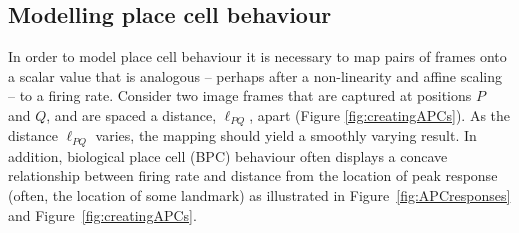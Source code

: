 %
%
%
%



\subsection{Modelling place cell behaviour}
\label{sec:kerneltoAPC}
In order to model place cell behaviour it is necessary to map pairs of frames onto a scalar value that is analogous -- perhaps after a non-linearity and affine scaling -- to a firing rate. Consider two image frames that are captured at positions $P$ and $Q$, and are spaced a distance, $\ell_{PQ}$, apart (Figure \ref{fig:creatingAPCs}). As the distance $\ell_{PQ}$ varies, the mapping should yield a smoothly varying result. In addition, biological place cell (BPC) behaviour often displays a concave relationship between firing rate and distance from the location of peak response (often, the location of some landmark) as illustrated in Figure~\ref{fig:APCresponses} and Figure~\ref{fig:creatingAPCs}.


